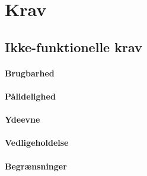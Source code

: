 \chapter{Krav}

\section*{Ikke-funktionelle krav}

\subsubsection*{Brugbarhed}

\subsubsection*{Pålidelighed}

\subsubsection*{Ydeevne}

\subsubsection*{Vedligeholdelse}

\subsubsection*{Begrænsninger}

